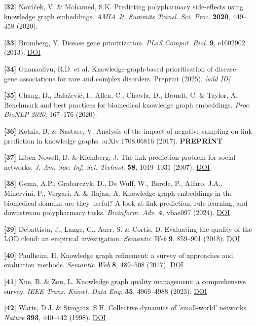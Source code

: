 \textbf{{[}32{]}} Nováček, V. \& Mohamed, S.K. Predicting polypharmacy side-effects using knowledge graph embeddings. \emph{AMIA Jt. Summits Transl. Sci. Proc.} \textbf{2020}, 449--458 (2020).

\textbf{{[}33{]}} Bromberg, Y. Disease gene prioritization. \emph{PLoS Comput. Biol.} \textbf{9}, e1002902 (2013). \href{https://doi.org/10.1371/journal.pcbi.1002902}{DOI}

\textbf{{[}34{]}} Gnanaolivu, R.D. et al. Knowledge-graph-based prioritisation of disease--gene associations for rare and complex disorders. Preprint (2025). \emph{{[}add ID{]}}

\textbf{{[}35{]}} Chang, D., Balažević, I., Allen, C., Chawla, D., Brandt, C. \& Taylor, A. Benchmark and best practices for biomedical knowledge graph embeddings. \emph{Proc. BioNLP 2020}, 167--176 (2020).

\textbf{{[}36{]}} Kotnis, B. \& Nastase, V. Analysis of the impact of negative sampling on link prediction in knowledge graphs. arXiv:1708.06816 (2017). \textbf{PREPRINT}

\textbf{{[}37{]}} Liben-Nowell, D. \& Kleinberg, J. The link prediction problem for social networks. \emph{J. Am. Soc. Inf. Sci. Technol.} \textbf{58}, 1019--1031 (2007). \href{https://doi.org/10.1002/asi.20591}{DOI}

\textbf{{[}38{]}} Gema, A.P., Grabarczyk, D., De Wulf, W., Borole, P., Alfaro, J.A., Minervini, P., Vergari, A. \& Rajan, A. Knowledge graph embeddings in the biomedical domain: are they useful? A look at link prediction, rule learning, and downstream polypharmacy tasks. \emph{Bioinform. Adv.} \textbf{4}, vbae097 (2024). \href{https://doi.org/10.1093/bioadv/vbae097}{DOI}

\textbf{{[}39{]}} Debattista, J., Lange, C., Auer, S. \& Cortis, D. Evaluating the quality of the LOD cloud: an empirical investigation. \emph{Semantic Web} \textbf{9}, 859--901 (2018). \href{https://doi.org/10.3233/SW-180307}{DOI}

\textbf{{[}40{]}} Paulheim, H. Knowledge graph refinement: a survey of approaches and evaluation methods. \emph{Semantic Web} \textbf{8}, 489--508 (2017). \href{https://doi.org/10.3233/SW-160218}{DOI}

\textbf{{[}41{]}} Xue, B. \& Zou, L. Knowledge graph quality management: a comprehensive survey. \emph{IEEE Trans. Knowl. Data Eng.} \textbf{35}, 4969--4988 (2023). \href{https://doi.org/10.1109/TKDE.2022.3150080}{DOI}

\textbf{{[}42{]}} Watts, D.J. \& Strogatz, S.H. Collective dynamics of 'small-world' networks. \emph{Nature} \textbf{393}, 440--442 (1998). \href{https://doi.org/10.1038/30918}{DOI}

